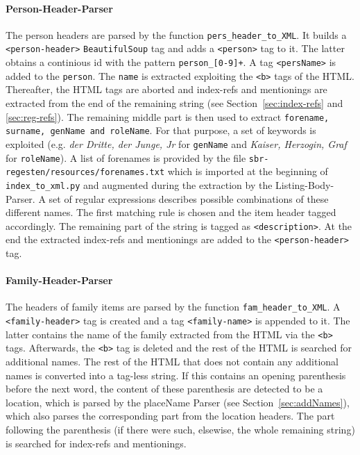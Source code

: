 \paragraph{Person-Header-Parser}
The person headers are parsed by the function \texttt{pers\_header\_to\_XML}. It builds a \texttt{<person-header>} \texttt{BeautifulSoup} tag and adds a \texttt{<person>} tag to it. The latter obtains a continious id with the pattern \texttt{person\_[0-9]+}. A tag \texttt{<persName>} is added to the \texttt{person}. The \texttt{name} is extracted exploiting the \texttt{<b>} tags of the HTML. Thereafter, the HTML tags are aborted and index-refs and mentionings are extracted from the end of the remaining string (see Section~\ref{sec:index-refs} and \ref{sec:reg-refs}). The remaining middle part is then used to extract \texttt{forename, surname, genName and roleName}. For that purpose, a set of keywords is exploited (e.g. \textit{der Dritte, der Junge, Jr} for \texttt{genName} and \textit{Kaiser, Herzogin, Graf} for \texttt{roleName}). A list of forenames is provided by the file \texttt{sbr-regesten/resources/forenames.txt} which is imported at the beginning of \texttt{index\_to\_xml.py} and augmented during the extraction by the Listing-Body-Parser. A set of regular expressions describes possible combinations of these different names. The first matching rule is chosen and the item header tagged accordingly. The remaining part of the string is tagged as \texttt{<description>}. At the end the extracted index-refs and mentionings are added to the \texttt{<person-header>} tag.

\paragraph{Family-Header-Parser}
The headers of family items are parsed by the function \texttt{fam\_header\_to\_XML}. A \texttt{<family-header>} tag is created and a tag \texttt{<family-name>} is appended to it. The latter contains the name of the family extracted from the HTML via the \texttt{<b>} tags. Afterwards, the \texttt{<b>} tag is deleted and the rest of the HTML is searched for additional names. The rest of the HTML that does not contain any additional names is converted into a tag-less string. If this contains an opening parenthesis before the next word, the content of these parenthesis are detected to be a location, which is parsed by the placeName Parser (see Section~\ref{sec:addNames}), which also parses the corresponding part from the location headers. The part following the parenthesis (if there were such, elsewise, the whole remaining string) is searched for index-refs and mentionings.

